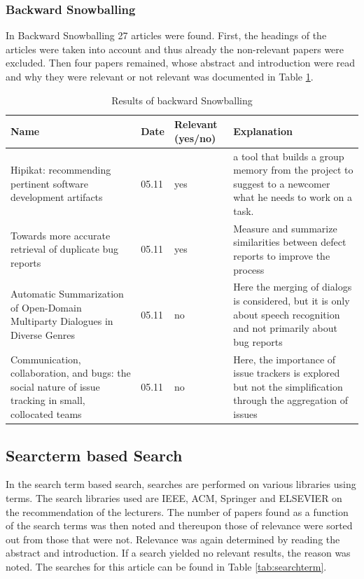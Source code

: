 \documentclass[a4paper,10pt, bibliography=totocnumbered]{scrreprt}
\begin{document}
\subsubsection{Backward Snowballing}

In Backward Snowballing 27 articles were found. First, the headings of the articles were taken into account and thus already the non-relevant papers were excluded. Then four papers remained, whose abstract and introduction were read and why they were relevant or not relevant was documented in Table \ref{tab:backward}. 

\begin{table}
\begin{tabular}[h]{p{3cm}|p{3cm}|p{3cm}|p{3cm}}
Name & Date & Relevant (yes/no) & Explanation \\
\hline
Hipikat: recommending pertinent software development artifacts & 05.11 & yes & a tool that builds a group memory from the project to suggest to a newcomer what he needs to work on a task. \\
\hline
Towards more accurate retrieval of duplicate bug reports & 05.11 & yes & Measure and summarize similarities between defect reports to improve the process \\
\hline
Automatic Summarization of Open-Domain Multiparty Dialogues in Diverse Genres & 05.11 & no & Here the merging of dialogs is considered, but it is only about speech recognition and not primarily about bug reports  \\
\hline
Communication, collaboration, and bugs: the social nature of issue tracking in small, collocated teams & 05.11 & no & Here, the importance of issue trackers is explored but not the simplification through the aggregation of issues \\
\end{tabular}
\caption{Results of backward Snowballing}
\label{tab:backward}
\end{table}

\subsection{Searcterm based Search}
In the search term based search, searches are performed on various libraries using terms. The search libraries used are IEEE, ACM, Springer and ELSEVIER on the recommendation of the lecturers. The number of papers found as a function of the search terms was then noted and thereupon those of relevance were sorted out from those that were not. Relevance was again determined by reading the abstract and introduction. If a search yielded no relevant results, the reason was noted.
The searches for this article can be found in Table \ref{tab:searchterm}.
\end{document}
